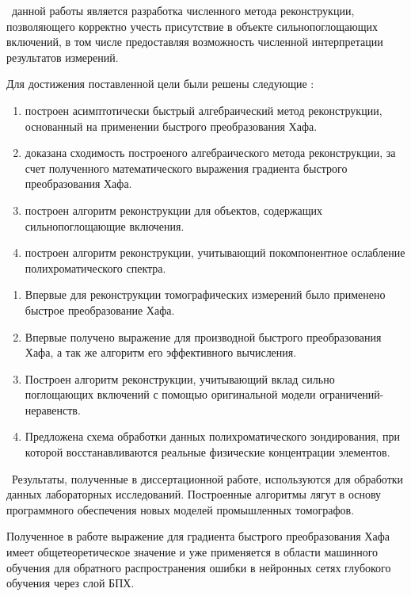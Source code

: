 

{\aim} ~данной работы является разработка численного метода реконструкции, позволяющего корректно учесть присутствие в объекте сильнопоглощающих включений, в том числе предоставляя возможность численной интерпретации результатов измерений.

Для достижения поставленной цели были решены следующие {\tasks}:
\begin{enumerate}
  \item построен асимптотически быстрый алгебраический метод реконструкции, основанный на применении быстрого преобразования Хафа.
  \item доказана сходимость построеного алгебраического метода реконструкции, за счет полученного математического выражения градиента быстрого преобразования Хафа.
  \item построен алгоритм реконструкции для объектов, содержащих сильнопоглощающие включения.
  \item построен алгоритм реконструкции, учитывающий покомпонентное ослабление полихроматического спектра.
\end{enumerate}

{\novelty}
\begin{enumerate}
  \item Впервые для реконструкции томографических измерений было применено быстрое преобразование Хафа.
  \item Впервые получено выражение для производной быстрого преобразования Хафа, а так же алгоритм его эффективного вычисления.
  \item Построен алгоритм реконструкции, учитывающий вклад сильно поглощающих включений с помощью оригинальной модели ограничений-неравенств.
  \item Предложена схема обработки данных полихроматического зондирования, при которой восстанавливаются реальные физические концентрации элементов.
\end{enumerate}

{\influence} ~Результаты, полученные в диссертационной работе, используются для обработки данных лабораторных исследований. Построенные алгоритмы лягут в основу программного обеспечения новых моделей промышленных томографов.

Полученное в работе выражение для градиента быстрого преобразования Хафа имеет общетеоретическое значение и уже применяется в области машинного обучения для обратного распространения ошибки в нейронных сетях глубокого обучения через слой БПХ.

